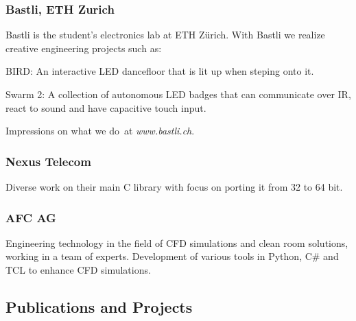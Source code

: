 \begin{timeline}
    \subsubsection{Bastli, ETH Zurich}
    Bastli is the student's electronics lab at ETH Zürich.
    With Bastli we realize creative engineering projects such as:
    \vspace{\topsep} %
    \begin{tightemize}
    \item BIRD: An interactive LED dancefloor that is lit up when steping onto it. 
    \item Swarm 2: A collection of autonomous LED badges that can communicate over IR, react to sound and have capacitive touch input.
    \end{tightemize}
    Impressions on what we do at \textit{www.bastli.ch}.
    \sectionsep
    
    \subsubsection{Nexus Telecom}
    Diverse work on their main C library with focus on porting it from 32 to 64 bit.
    \sectionsep
    
    \subsubsection{AFC AG}
    Engineering technology in the field of CFD simulations and clean room solutions, working in a team of experts.
    Development of various tools in Python, C\# and TCL to enhance CFD simulations.
    \sectionsep
    
    
    
    \subsection{Publications and Projects}
    

\end{timeline}
